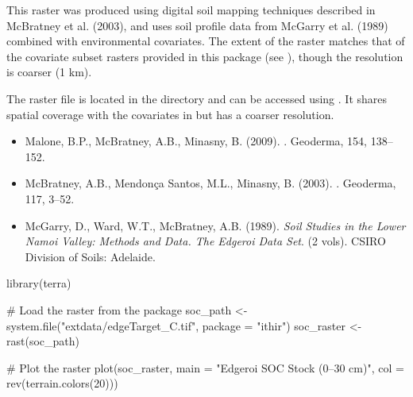 \documentclass[a4paper]{book}
\begin{document}
%
\begin{Details}
This raster was produced using digital soil mapping techniques described in McBratney et al. (2003), and uses soil profile data from McGarry et al. (1989) combined with environmental covariates. The extent of the raster matches that of the covariate subset rasters provided in this package (see ), though the resolution is coarser (1 km).
\end{Details}
%
\begin{Note}
The raster file is located in the  directory and can be accessed using . It shares spatial coverage with the covariates in  but has a coarser resolution.
\end{Note}
%
\begin{References}
\begin{itemize}

\item{} Malone, B.P., McBratney, A.B., Minasny, B. (2009). . Geoderma, 154, 138–152.
\item{} McBratney, A.B., Mendonça Santos, M.L., Minasny, B. (2003). . Geoderma, 117, 3–52.
\item{} McGarry, D., Ward, W.T., McBratney, A.B. (1989). \emph{Soil Studies in the Lower Namoi Valley: Methods and Data. The Edgeroi Data Set}. (2 vols). CSIRO Division of Soils: Adelaide.

\end{itemize}

\end{References}
%
\begin{Examples}
\begin{ExampleCode}
library(terra)

# Load the raster from the package
soc_path <- system.file("extdata/edgeTarget_C.tif", package = "ithir")
soc_raster <- rast(soc_path)

# Plot the raster
plot(soc_raster, main = "Edgeroi SOC Stock (0–30 cm)", col = rev(terrain.colors(20)))
\end{ExampleCode}
\end{Examples}
\end{document}
